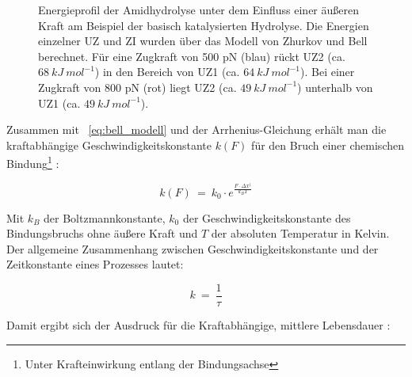 \begin{figure}[h]
	\centering
	\caption[Energieprofil der Amidhydrolyse unter dem Einfluss einer äußeren Kraft]{Energieprofil der Amidhydrolyse unter dem Einfluss einer äußeren Kraft am Beispiel der basisch katalysierten Hydrolyse. Die Energien einzelner \acs*{UZ} und \acs*{ZI} wurden über das Modell von Zhurkov und Bell berechnet. Für eine Zugkraft von 500 pN (blau) rückt \acs*{UZ}2 (ca. $68~kJ~mol^{-1}$) in den Bereich von \acs*{UZ}1 (ca. $64~kJ~mol^{-1}$). Bei einer Zugkraft von 800 pN (rot) liegt \acs*{UZ}2 (ca. $49~kJ~mol^{-1}$) unterhalb von \acs*{UZ}1 (ca. $49~kJ~mol^{-1}$).}
	\label{fig:energieprofil_mit_kraft}
\end{figure}


Zusammen mit \gl~\ref{eq:bell_modell} und der Arrhenius-Gleichung erhält man die kraftabhängige Geschwindigkeitskonstante $k(F)$ für den Bruch einer chemischen Bindung\footnote{Unter Krafteinwirkung entlang der Bindungsachse} \cite{RibasArino.2012}:

\begin{equation}
	k(F)~=~k_0 \cdot e^{\frac{F \cdot \Delta x^\ddag}{k_B T}}
	\label{eq:k_kraftabhängig}
\end{equation}

Mit $k_B$ der Boltzmannkonstante, $k_0$ der Geschwindigkeitskonstante des Bindungsbruchs ohne äußere Kraft und $T$ der absoluten Temperatur in Kelvin. Der allgemeine Zusammenhang zwischen Geschwindigkeitskonstante und der Zeitkonstante eines Prozesses lautet:

\[ k~=~\frac{1}{\tau} \]

Damit ergibt sich der Ausdruck für die Kraftabhängige, mittlere Lebensdauer \cite{Glockner.2011}:


